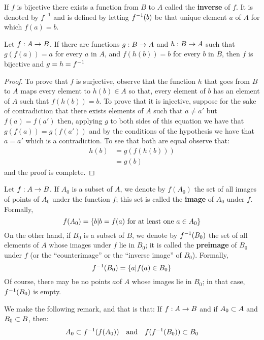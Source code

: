 If $f$ is bijective there exists a function from $B$ to $A$ called the \textbf{inverse} of $f$. It is denoted by $ f^{-1} $ and is defined by letting $ f^{-1}(b) $ be that unique element $a$ of $A$   for which $f(a) = b$. 

\begin{lem}
	Let $f : A \rightarrow B $. If there are functions $ g : B \rightarrow A $ and $ h : B \rightarrow A $ such that $ g(f(a)) = a $ for every $a$ in $A$, and $f(h(b)) = b$ for every $b$ in $B$, then $f$ is bijective and $ g = h= f^{-1} $
\end{lem}
\begin{proof}
	To prove that $f$ is surjective, observe that the function $h$ that goes from $B$ to $A$ maps every element to $h(b) \in A$ so that, every element of $b$ has an element of $A$ such that $ f(h(b)) = b$. To prove that it is injective, suppose for the sake of contradiction that there exists elements of $A$ such that $ a \neq a' $ but $f(a) = f(a') $ then, applying $g$ to both sides of this equation we have that $ g(f(a)) = g(f(a')) $ and by the conditions of the hypothesis we have that $a = a'$ which is a contradiction. To see that both are equal observe that:
	\begin{align*}
	h(b) &= g(f(h(b))) \\
		 &= g(b)		
	\end{align*}
	and the proof is complete.
\end{proof}
\begin{defn}
	Let $ f : A \rightarrow B $. If $A_0$ is a subset of $A$, we denote by $f(A_0)$ the set of all images of points of $A_0$ under the function $f$; this set is called the \textbf{image} of $A_0$ under $f$. Formally,
	\[ f(A_0) = \left\lbrace b | b = f(a) \textrm{ for at least one } a \in A_0 \right\rbrace \]
	On the other hand, if $ B_0 $  is a subset of $B$, we denote by $f^{-1}(B_0) $ the set of all elements of $A$ whose images under $f$ lie in $B_0$; it is called the \textbf{preimage} of $B_0$ under $f$ (or the ``counterimage'' or the ``inverse image'' of $B_0$). Formally,
	\[ f^{-1}(B_0) = \left\lbrace a | f(a) \in B_0 \right\rbrace \]
	Of course, there may be no points $a$of $A$ whose images lie in $ B_0 $; in that case, $f^{-1} (B_0) $ is empty.
	
\end{defn}

We make the following remark, and that is that: If $ f : A \rightarrow B $  and if $A_0 \subset A$ and $B_0 \subset B$, then:
\[ A_0 \subset f^{-1}(f(A_0)) \quad \textrm{and} \quad f(f^{-1}(B_0)) \subset B_0 \]


